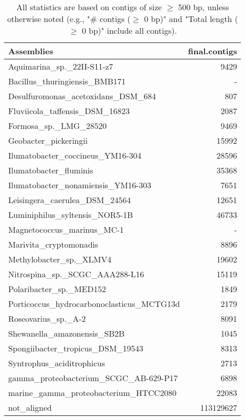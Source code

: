 \documentclass[12pt,a4paper]{article}
\begin{document}
\begin{table}[ht]
\begin{center}
\caption{All statistics are based on contigs of size $\geq$ 500 bp, unless otherwise noted (e.g., "\# contigs ($\geq$ 0 bp)" and "Total length ($\geq$ 0 bp)" include all contigs).}
\begin{tabular}{|l*{1}{|r}|}
\hline
Assemblies & final.contigs \\ \hline
Aquimarina\_sp.\_22II-S11-z7 & 9429 \\ \hline
Bacillus\_thuringiensis\_BMB171 & - \\ \hline
Desulfuromonas\_acetoxidans\_DSM\_684 & 807 \\ \hline
Fluviicola\_taffensis\_DSM\_16823 & 2087 \\ \hline
Formosa\_sp.\_LMG\_28520 & 9469 \\ \hline
Geobacter\_pickeringii & 15992 \\ \hline
Ilumatobacter\_coccineus\_YM16-304 & 28596 \\ \hline
Ilumatobacter\_fluminis & 35368 \\ \hline
Ilumatobacter\_nonamiensis\_YM16-303 & 7651 \\ \hline
Leisingera\_caerulea\_DSM\_24564 & 12651 \\ \hline
Luminiphilus\_syltensis\_NOR5-1B & 46733 \\ \hline
Magnetococcus\_marinus\_MC-1 & - \\ \hline
Marivita\_cryptomonadis & 8896 \\ \hline
Methylobacter\_sp.\_XLMV4 & 19602 \\ \hline
Nitrospina\_sp.\_SCGC\_AAA288-L16 & 15119 \\ \hline
Polaribacter\_sp.\_MED152 & 1849 \\ \hline
Porticoccus\_hydrocarbonoclasticus\_MCTG13d & 2179 \\ \hline
Roseovarius\_sp.\_A-2 & 8091 \\ \hline
Shewanella\_amazonensis\_SB2B & 1045 \\ \hline
Spongiibacter\_tropicus\_DSM\_19543 & 8313 \\ \hline
Syntrophus\_aciditrophicus & 2713 \\ \hline
gamma\_proteobacterium\_SCGC\_AB-629-P17 & 6898 \\ \hline
marine\_gamma\_proteobacterium\_HTCC2080 & 22083 \\ \hline
not\_aligned & 113129627 \\ \hline
\end{tabular}
\end{center}
\end{table}
\end{document}
